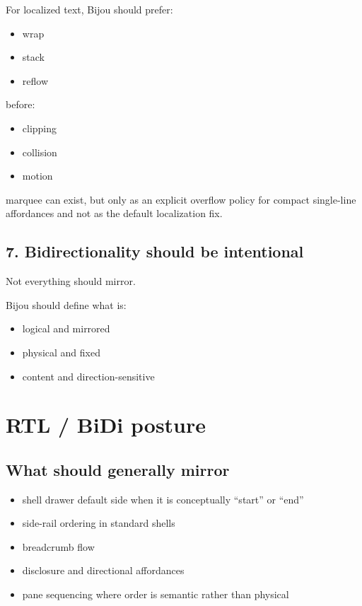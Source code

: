 For localized text, Bijou should prefer:

\begin{itemize}
\tightlist
\item
  wrap
\item
  stack
\item
  reflow
\end{itemize}

before:

\begin{itemize}
\tightlist
\item
  clipping
\item
  collision
\item
  motion
\end{itemize}

marquee can exist, but only as an explicit overflow policy for compact single-line affordances and not as the default localization fix.

\subsection{7. Bidirectionality should be intentional}\label{record-051-bidirectionality-should-be-intentional}

Not everything should mirror.

Bijou should define what is:

\begin{itemize}
\tightlist
\item
  logical and mirrored
\item
  physical and fixed
\item
  content and direction-sensitive
\end{itemize}

\section{RTL / BiDi posture}\label{record-051-rtl-bidi-posture}

\subsection{What should generally mirror}\label{record-051-what-should-generally-mirror}

\begin{itemize}
\tightlist
\item
  shell drawer default side when it is conceptually ``start'' or ``end''
\item
  side-rail ordering in standard shells
\item
  breadcrumb flow
\item
  disclosure and directional affordances
\item
  pane sequencing where order is semantic rather than physical
\end{itemize}

